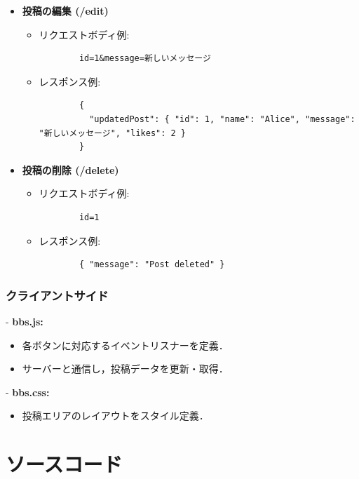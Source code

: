 \documentclass[uplatex,dvipdfmx]{jsarticle}
\begin{document}
\begin{itemize}
  \item \textbf{投稿の編集 (/edit)}
    \begin{itemize}
      \item リクエストボディ例:
        \begin{verbatim}
        id=1&message=新しいメッセージ
        \end{verbatim}
      \item レスポンス例:
        \begin{verbatim}
        {
          "updatedPost": { "id": 1, "name": "Alice", "message": "新しいメッセージ", "likes": 2 }
        }
        \end{verbatim}
    \end{itemize}

  \item \textbf{投稿の削除 (/delete)}
    \begin{itemize}
      \item リクエストボディ例:
        \begin{verbatim}
        id=1
        \end{verbatim}
      \item レスポンス例:
        \begin{verbatim}
        { "message": "Post deleted" }
        \end{verbatim}
    \end{itemize}
\end{itemize}

\subsubsection*{クライアントサイド}
- \textbf{bbs.js:}
  \begin{itemize}
    \item 各ボタンに対応するイベントリスナーを定義．
    \item サーバーと通信し，投稿データを更新・取得．
  \end{itemize}

- \textbf{bbs.css:}
  \begin{itemize}
    \item 投稿エリアのレイアウトをスタイル定義．
  \end{itemize}

\section{ソースコード}
\url{}
\end{document}
